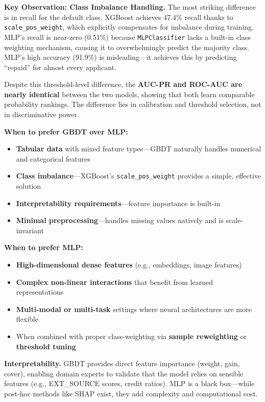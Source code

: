 \documentclass[11pt, letterpaper]{article}
\begin{document}
\textbf{Key Observation: Class Imbalance Handling.} The most striking difference is in recall for the default class. XGBoost achieves 47.4\% recall thanks to \texttt{scale\_pos\_weight}, which explicitly compensates for imbalance during training. MLP's recall is near-zero (0.51\%) because \texttt{MLPClassifier} lacks a built-in class weighting mechanism, causing it to overwhelmingly predict the majority class. MLP's high accuracy (91.9\%) is misleading---it achieves this by predicting ``repaid'' for almost every applicant.

Despite this threshold-level difference, the \textbf{AUC-PR and ROC-AUC are nearly identical} between the two models, showing that both learn comparable probability rankings. The difference lies in calibration and threshold selection, not in discriminative power.

\textbf{When to prefer GBDT over MLP:}
\begin{itemize}[nosep]
    \item \textbf{Tabular data} with mixed feature types---GBDT naturally handles numerical and categorical features
    \item \textbf{Class imbalance}---XGBoost's \texttt{scale\_pos\_weight} provides a simple, effective solution
    \item \textbf{Interpretability requirements}---feature importance is built-in
    \item \textbf{Minimal preprocessing}---handles missing values natively and is scale-invariant
\end{itemize}

\textbf{When to prefer MLP:}
\begin{itemize}[nosep]
    \item \textbf{High-dimensional dense features} (e.g., embeddings, image features)
    \item \textbf{Complex non-linear interactions} that benefit from learned representations
    \item \textbf{Multi-modal or multi-task} settings where neural architectures are more flexible
    \item When combined with proper class-weighting via \textbf{sample reweighting} or \textbf{threshold tuning}
\end{itemize}

\textbf{Interpretability.} GBDT provides direct feature importance (weight, gain, cover), enabling domain experts to validate that the model relies on sensible features (e.g., EXT\_SOURCE scores, credit ratios). MLP is a black box---while post-hoc methods like SHAP exist, they add complexity and computational cost.
\end{document}
